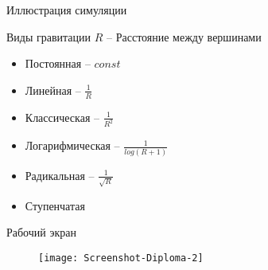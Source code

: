 \documentclass{beamer}
\theoremstyle{plain}
\begin{document}

\begin{frame}{Иллюстрация симуляции}
  \begin{figure}
    \centering
    \def\svgwidth{\columnwidth}
    
  \end{figure}
\end{frame}


\begin{frame}{Виды гравитации}
  $R$ -- Расстояние между вершинами
  \begin{itemize}
    \item Постоянная -- $const$
    \item Линейная -- $\frac{1}{R}$
    \item Классическая -- $\frac{1}{R^2}$
    \item Логарифмическая -- $\frac{1}{log(R + 1)}$
    \item Радикальная -- $\frac{1}{\sqrt R}$
    \item Ступенчатая
  \end{itemize}
\end{frame}


\begin{frame}{Рабочий экран}
  \begin{figure}[h]
    \centering
    \texttt{[image: Screenshot-Diploma-2]}
  \end{figure}
\end{frame}
\end{document}
